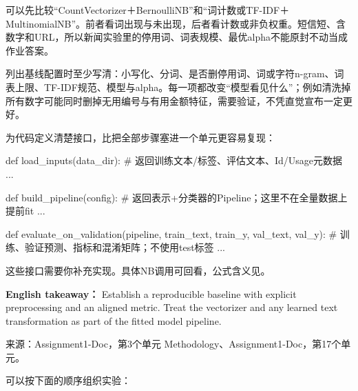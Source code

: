 可以先比较“CountVectorizer＋BernoulliNB”和“词计数或TF-IDF＋MultinomialNB”。前者看词出现与未出现，后者看计数或非负权重。短信短、含数字和URL，所以新闻实验里的停用词、词表规模、最优alpha不能原封不动当成作业答案。


列出基线配置时至少写清：小写化、分词、是否删停用词、词或字符n-gram、词表上限、TF-IDF规范、模型与alpha。每一项都改变“模型看见什么”；例如清洗掉所有数字可能同时删掉无用编号与有用金额特征，需要验证，不凭直觉宣布一定更好。


为代码定义清楚接口，比把全部步骤塞进一个单元更容易复现：



\begin{StudyCode}
def load_inputs(data_dir):
    # 返回训练文本/标签、评估文本、Id/Usage元数据
    ...

def build_pipeline(config):
    # 返回表示+分类器的Pipeline；这里不在全量数据上提前fit
    ...

def evaluate_on_validation(pipeline, train_text, train_y,
                           val_text, val_y):
    # 训练、验证预测、指标和混淆矩阵；不使用test标签
    ...
\end{StudyCode}


这些接口需要你补充实现。具体NB调用可回看，公式含义见。


\textbf{English takeaway：} Establish a reproducible baseline with explicit preprocessing and an aligned metric. Treat the vectorizer and any learned text transformation as part of the fitted model pipeline.


来源：Assignment1-Doc，第3个单元 Methodology、Assignment1-Doc，第17个单元。








可以按下面的顺序组织实验：



